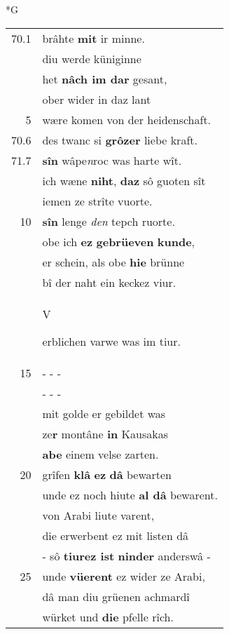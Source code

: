 \documentclass[8pt,a4paper,notitlepage]{article}
\begin{document}
\newpage
\begin{table}[ht]
\begin{minipage}[t]{0.5\linewidth}
\small
\begin{center}*G
\end{center}
\begin{tabular}{rl}
70.1 & brâhte \textbf{mit} ir minne.\\ 
 & diu werde küniginne\\ 
 & het \textbf{nâch im dar} gesant,\\ 
 & ober wider in daz lant\\ 
5 & wære komen von der heidenschaft.\\ 
70.6 & des twanc si \textbf{grôzer} liebe kraft.\\ 
71.7 & \textbf{sîn} wâpe\textit{n}roc was harte wît.\\ 
 & ich wæne \textbf{niht}, \textbf{daz} sô guoten sît\\ 
 & iemen ze strîte vuorte.\\ 
10 & \textbf{sîn} lenge \textit{den} tepch ruorte.\\ 
 & obe ich \textbf{ez} \textbf{gebrüeven} \textbf{kunde},\\ 
 & er schein, als obe \textbf{hie} brünne\\ 
 & bî der naht ein keckez viur.\\ 
 & \begin{large}V\end{large}erblichen varwe was im tiur.\\ 
15 & \multicolumn{1}{l}{ - - - }\\ 
 & \multicolumn{1}{l}{ - - - }\\ 
 & mit golde er gebildet was\\ 
 & ze\textbf{r} montâne \textbf{in} Kausakas\\ 
 & \textbf{abe} einem velse zarten.\\ 
20 & grîfen \textbf{klâ} \textbf{ez} \textbf{dâ} bewarten\\ 
 & unde ez noch hiute \textbf{al dâ} bewarent.\\ 
 & von Arabi liute varent,\\ 
 & die erwerbent ez mit listen dâ\\ 
 & - sô \textbf{tiurez ist} \textbf{ninder} anderswâ -\\ 
25 & unde \textbf{vüerent} ez wider ze Arabi,\\ 
 & dâ man diu grüenen achmardî\\ 
 & würket und \textbf{die} pfelle rîch.\\ 

\end{tabular}
\end{minipage}
\end{table}
\end{document}

